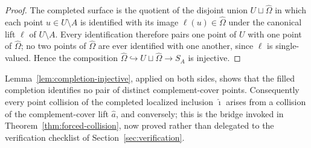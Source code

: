 \begin{proof}
The completed surface is the quotient of the disjoint union
$U\sqcup\widehat\Omega$ in which each point $u\in U\setminus A$ is
identified with its image $\ell(u)\in\widehat\Omega$ under the
canonical lift $\ell$ of $U\setminus A$.  Every identification therefore
pairs one point of $U$ with one point of $\widehat\Omega$; no two
points of $\widehat\Omega$ are ever identified with one another, since
$\ell$ is single-valued.  Hence the composition
$\widehat\Omega\hookrightarrow U\sqcup\widehat\Omega\to S_A$ is
injective.
\end{proof}

\begin{remark}\label{rem:completion-consequence}
Lemma~\ref{lem:completion-injective}, applied on both sides, shows that
the filled completion identifies no pair of distinct complement-cover
points.  Consequently every point collision of the completed localized
inclusion $\widehat\imath$ arises from a collision of the
complement-cover lift $\widehat a$, and conversely; this is the bridge
invoked in Theorem~\ref{thm:forced-collision}, now proved rather than
delegated to the verification checklist of
Section~\ref{sec:verification}.
\end{remark}

